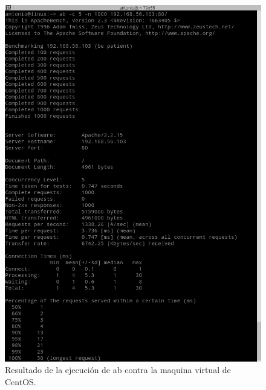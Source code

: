 \begin{figure}[H]
  \begin{center}
    \includegraphics[width=1\textwidth]{imagenes/abce}
    \caption{Resultado de la ejecución de ab contra la maquina virtual de CentOS.}
    \label{fig4}
  \end{center}
\end{figure}
